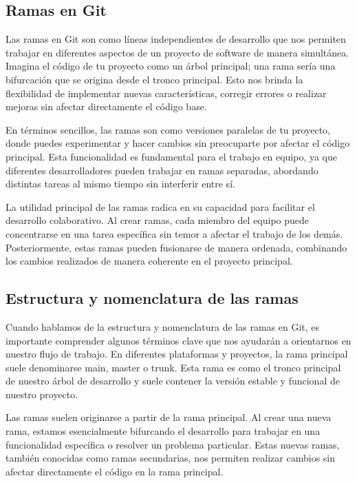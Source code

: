 \subsection*{Ramas en Git}

Las ramas en Git son como líneas independientes de desarrollo que nos permiten trabajar 
en diferentes aspectos de un proyecto de software de manera simultánea. Imagina el 
código de tu proyecto como un árbol principal; una rama sería una bifurcación que se 
origina desde el tronco principal. Esto nos brinda la flexibilidad de implementar 
nuevas características, corregir errores o realizar mejoras sin afectar directamente
el código base. 


En términos sencillos, las ramas son como versiones paralelas de tu proyecto, donde
puedes experimentar y hacer cambios sin preocuparte por afectar el código principal. 
Esta funcionalidad es fundamental para el trabajo en equipo, ya que diferentes 
desarrolladores pueden trabajar en ramas separadas, abordando distintas tareas al mismo 
tiempo sin interferir entre sí.


La utilidad principal de las ramas radica en su capacidad para facilitar el desarrollo 
colaborativo. Al crear ramas, cada miembro del equipo puede concentrarse en una tarea 
específica sin temor a afectar el trabajo de los demás. Posteriormente, estas ramas 
pueden fusionarse de manera ordenada, combinando los cambios realizados de manera 
coherente en el proyecto principal.

\subsection*{Estructura y nomenclatura de las ramas}

Cuando hablamos de la estructura y nomenclatura de las ramas en Git, es importante 
comprender algunos términos clave que nos ayudarán a orientarnos en nuestro flujo 
de trabajo. En diferentes plataformas y proyectos, la rama principal suele denominarse 
main, master o trunk. Esta rama es como el tronco principal de nuestro árbol de 
desarrollo y suele contener la versión estable y funcional de nuestro proyecto.


Las ramas suelen originarse a partir de la rama principal. Al crear una nueva rama,
estamos esencialmente bifurcando el desarrollo para trabajar en una funcionalidad 
específica o resolver un problema particular. Estas nuevas ramas, también conocidas 
como ramas secundarias, nos permiten realizar cambios sin afectar directamente el 
código en la rama principal.

